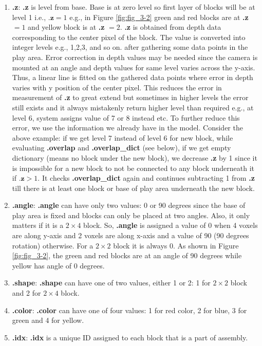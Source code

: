 \begin{enumerate}
\begin{enumerate}
        \item \textbf{.z}: \textbf{.z} is level from base. Base is at zero level so first layer of blocks will be at level 1 i.e., $\textbf{.z} = 1$ e.g., in Figure \ref{fig:fig_3-2} green and red blocks are at \textbf{.z} $=1$ and yellow block is at \textbf{.z} $=2$. \textbf{.z} is obtained from depth data corresponding to the center pixel of the block. The value is converted into integer levels e.g., 1,2,3, and so on. after gathering some data points in the play area. Error correction in depth values may be needed since the camera is mounted at an angle and depth values for same level varies across the y-axis. Thus, a linear line is fitted on the gathered data points where error in depth varies with y position of the center pixel. This reduces the error in measurement of \textbf{.z} to great extend but sometimes in higher levels the error still exists and it always mistakenly return higher level than required e.g., at level 6, system assigns value of 7 or 8 instead etc. To further reduce this error, we use the information we already have in the model. Consider the above example: if we get level 7 instead of level 6 for new block, while evaluating \textbf{.overlap} and \textbf{.overlap\_dict} (see below), if we get empty dictionary (means no block under the new block), we decrease \textbf{.z} by 1 since it is impossible for a new block to not be connected to any block underneath it if $\textbf{.z} > 1$. It checks \textbf{.overlap\_dict} again and continues subtracting 1 from \textbf{.z} till there is at least one block or base of play area underneath the new block.
        \item \textbf{.angle}: \textbf{.angle} can have only two values: 0 or 90 degrees since the base of play area is fixed and blocks can only be placed at two angles. Also, it only matters if it is a $2 \times 4$ block. So, \textbf{.angle} is assigned a value of 0 when 4 voxels are along y-axis and 2 voxels are along x-axis and a value of 90 (90 degrees rotation) otherwise. For a $2 \times 2$ block it is always 0.  As shown in Figure \ref{fig:fig_3-2}, the green and red blocks are at an angle of 90 degrees while yellow has angle of 0 degrees.
        \item \textbf{.shape}: \textbf{.shape} can have one of two values, either 1 or 2:  1 for $2 \times 2$ block and 2 for $2 \times 4$ block.
        \item \textbf{.color}: \textbf{.color} can have one of four values: 1 for red color, 2 for blue, 3 for green and 4 for yellow.
        \item \textbf{.idx}: \textbf{.idx} is a unique ID assigned to each block that is a part of assembly. 

\end{enumerate}
\end{enumerate}
